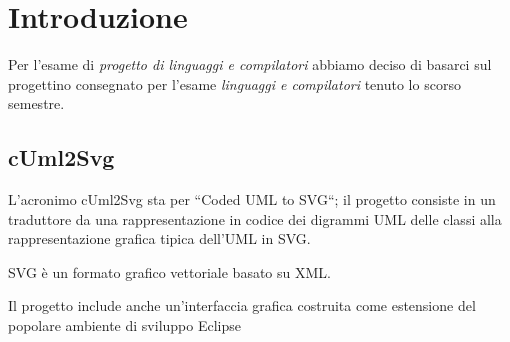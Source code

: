 \chapter{Introduzione}

Per l'esame di \emph{progetto di linguaggi e compilatori} abbiamo deciso di
basarci sul progettino consegnato per l'esame \emph{linguaggi e compilatori}
tenuto lo scorso semestre. 



\section{cUml2Svg} 
L'acronimo cUml2Svg sta per ``Coded UML to SVG``; 
il progetto consiste in un traduttore da una rappresentazione
in codice dei digrammi UML delle classi alla rappresentazione grafica
tipica dell'UML in SVG.

SVG è un formato grafico vettoriale basato su XML.

Il progetto include anche un'interfaccia grafica costruita come estensione del
popolare ambiente di sviluppo Eclipse~\cite{eclipse_website:1}

